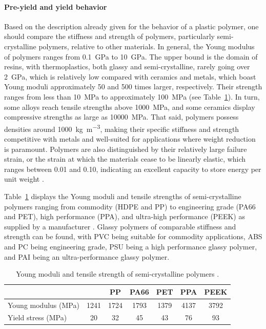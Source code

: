\paragraph{Pre-yield and yield behavior}

Based on the description already given for the behavior of a plastic polymer, one should compare the stiffness and strength of polymers, particularly semi-crystalline polymers, relative to other materials.
In general, the Young modulus of polymers ranges from \SI{0.1}{\giga\pascal} to \SI{10}{\giga\pascal}.
The upper bound is the domain of resins, with thermoplastics, both glassy and semi-crystalline, rarely going over \SI{2}{\giga\pascal}, which is relatively low compared with ceramics and metals, which boast Young moduli approximately 50 and 500 times larger, respectively.
Their strength ranges from less than \SI{10}{\mega\pascal} to approximately \SI{100}{\mega\pascal} (see Table~\ref{tab:scp_mech_props}).
In turn, some alloys reach tensile strengths above \SI{1000}{\mega\pascal}, and some ceramics display compressive strengths as large as \SI{10000}{\mega\pascal}.
That said, polymers possess densities around \SI{1000}{\kilo\gram\per\meter^3}, making their specific stiffness and strength competitive with metals and well-suited for applications where weight reduction is paramount.
Polymers are also distinguished by their relatively large failure strain, or the strain at which the materials cease to be linearly elastic, which ranges between 0.01 and 0.10, indicating an excellent capacity to store energy per unit weight \citep{ashbyMaterialsSelectionMechanical1999}.

Table~\ref{tab:scp_mech_props} displays the Young moduli and tensile strengths of semi-crystalline polymers ranging from commodity (HDPE and PP) to engineering grade (PA66 and PET), high performance (PPA), and ultra-high performance (PEEK) as supplied by a manufacturer \citep{rtpcompanyProductGuideRTP2021}.
Glassy polymers of comparable stiffness and strength can be found, with PVC being suitable for commodity applications, ABS and PC being engineering grade, PSU being a high performance glassy polymer, and PAI being an ultra-performance glassy polymer.
\begin{table}[hbpt]
    \centering
    \caption{Young moduli and tensile strength of semi-crystalline polymers \citep{rtpcompanyProductGuideRTP2021}.}
    \label{tab:scp_mech_props}
    \begin{tabular}{lcccccc}
        \hline\hline
        & \vphantom{\Big |}{HDPE} &{PP} &{PA66} &{PET} & {PPA}  &{PEEK} \\
        \hline
        \vphantom{\Big |}Young modulus (\si{\mega\pascal}) & 1241 & 1724 & 1793 & 1379 & 4137 & 3792  \\
        \vphantom{\Big |}Yield stress (\si{\mega\pascal}) & 20 & 32 & 45 & 43 & 76  & 93 \\
        \hline\hline
    \end{tabular}
\end{table}

